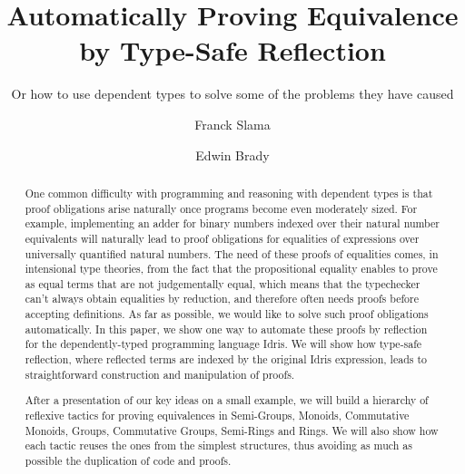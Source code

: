 \documentclass{llncs}
\begin{document}
%
\pagestyle{headings}  %

\mainmatter              %
%
\title{Automatically Proving Equivalence by Type-Safe Reflection}
\subtitle{Or how to use dependent types to solve some of the problems they have caused}
%
%
\author{Franck Slama \and Edwin Brady}

\maketitle              %

\begin{abstract}
One common difficulty with programming and reasoning with dependent types is that proof obligations arise naturally once programs become even moderately sized. For example, implementing an adder for binary numbers indexed over their natural number equivalents will naturally lead to proof obligations for equalities of expressions over universally quantified natural numbers. The need of these proofs of equalities comes, in intensional type theories, from the fact that the propositional equality enables to prove as equal terms that are not judgementally equal, which means that the typechecker can't always obtain equalities by reduction, and therefore often needs proofs before accepting definitions.
As far as possible, we would like to solve such proof obligations automatically. In this paper, we show one way to automate these proofs by reflection for the dependently-typed programming language Idris. We will show how type-safe reflection, where reflected terms are indexed by the original Idris expression, leads to straightforward construction and manipulation of proofs.

After a presentation of our key ideas on a small example, we will build a hierarchy of reflexive tactics for proving equivalences in Semi-Groups, Monoids, Commutative Monoids, Groups, Commutative Groups, Semi-Rings and Rings. We will also show how each tactic reuses the ones from the simplest structures, thus avoiding as much as possible the duplication of code and proofs.
\end{abstract}
%


\end{document}
